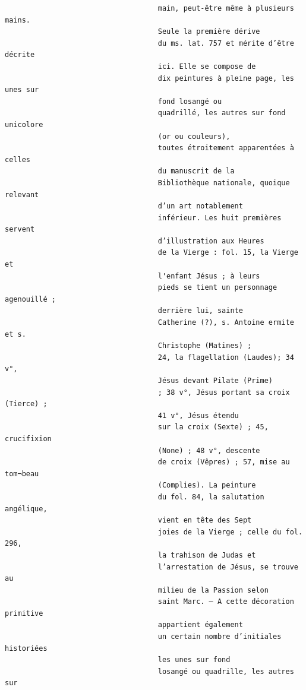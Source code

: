 \documentclass[a4paper,12pt,twoside]{book}
\begin{document}
\begin{verbatim}
                                    main, peut-être même à plusieurs mains.
                                    Seule la première dérive
                                    du ms. lat. 757 et mérite d’être décrite
                                    ici. Elle se compose de
                                    dix peintures à pleine page, les unes sur
                                    fond losangé ou
                                    quadrillé, les autres sur fond unicolore
                                    (or ou couleurs),
                                    toutes étroitement apparentées à celles
                                    du manuscrit de la
                                    Bibliothèque nationale, quoique relevant
                                    d’un art notablement
                                    inférieur. Les huit premières servent 
                                    d’illustration aux Heures
                                    de la Vierge : fol. 15, la Vierge et 
                                    l'enfant Jésus ; à leurs
                                    pieds se tient un personnage agenouillé ;
                                    derrière lui, sainte
                                    Catherine (?), s. Antoine ermite et s.
                                    Christophe (Matines) ;
                                    24, la flagellation (Laudes); 34 v°, 
                                    Jésus devant Pilate (Prime)
                                    ; 38 v°, Jésus portant sa croix (Tierce) ;
                                    41 v°, Jésus étendu
                                    sur la croix (Sexte) ; 45, crucifixion
                                    (None) ; 48 v°, descente
                                    de croix (Vêpres) ; 57, mise au tom¬beau 
                                    (Complies). La peinture
                                    du fol. 84, la salutation angélique, 
                                    vient en tête des Sept
                                    joies de la Vierge ; celle du fol. 296, 
                                    la trahison de Judas et
                                    l’arrestation de Jésus, se trouve au 
                                    milieu de la Passion selon
                                    saint Marc. — A cette décoration primitive 
                                    appartient également
                                    un certain nombre d’initiales historiées
                                    les unes sur fond
                                    losangé ou quadrille, les autres sur 

\end{verbatim}
\end{document}
